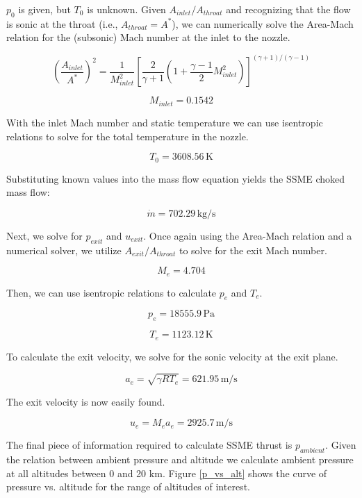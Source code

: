 \documentclass[../main.tex]{subfiles}
\begin{document}
\(p_0\) is given, but \(T_0\) is unknown. 
Given \(A_{inlet}/A_{throat}\) and recognizing that the flow is sonic at the throat (i.e., \(A_{throat} = A^*\)), we can numerically solve the Area-Mach relation for the (subsonic) Mach number at the inlet to the nozzle.

\[
    {\left({\frac{A_{inlet}}{A^*}}\right)}^2
    =
    \frac{1}{M_{inlet}^2}
    {\left[{
        \frac{2}{\gamma+1}
        \left({1 + \frac{\gamma-1}{2}M_{inlet}^2}\right)
    }\right]}^{(\gamma+1)/(\gamma-1)}
\]

\[
    M_{inlet} = 0.1542
\]

With the inlet Mach number and static temperature we can use isentropic relations to solve for the total temperature in the nozzle.

\[
    T_0 = 3608.56 \, \unit{\kelvin}
\]

Substituting known values into the mass flow equation yields the SSME choked mass flow:

\[
    \dot{m} = 702.29\, \unit{\kilogram/\second}
\]

Next, we solve for \(p_{exit}\) and \(u_{exit}\).
Once again using the Area-Mach relation and a numerical solver, we utilize \(A_{exit}/A_{throat}\) to solve for the exit Mach number.

\[
    M_e = 4.704  
\]

Then, we can use isentropic relations to calculate \(p_e\) and \(T_e\).

\[
    p_e = 18555.9\, \unit{\pascal}  
\]

\[
    T_e = 1123.12\, \unit{\kelvin}  
\]

To calculate the exit velocity, we solve for the sonic velocity at the exit plane.

\[
    a_{e} = \sqrt{\gamma R T_{e}} = 621.95\,\unit{\meter/\second}  
\]

The exit velocity is now easily found.

\[
    u_{e} = M_{e} a_{e} = 2925.7\,\unit{\meter/\second}  
\]

The final piece of information required to calculate SSME thrust is \(p_{ambient}\).
Given the relation between ambient pressure and altitude we calculate ambient pressure at all altitudes between 0 and 20 \(\unit{\kilo\meter}\).
Figure \ref{p_vs_alt} shows the curve of pressure vs. altitude for the range of altitudes of interest.
\end{document}
